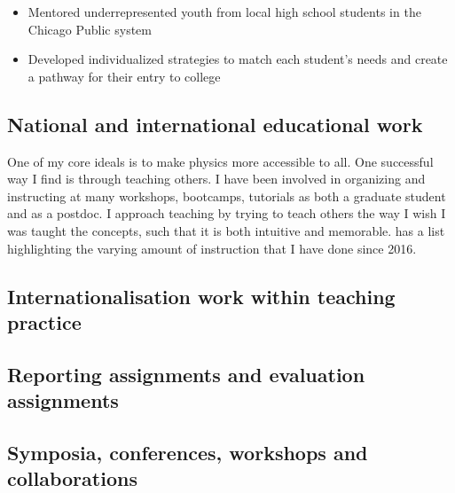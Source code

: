 \begin{itemize}
	\setlength{\itemsep}{0em}
	\item Mentored underrepresented youth from local high school students in the Chicago Public system
	\item Developed individualized strategies to match each student's needs and create a pathway for their entry to college
\end{itemize}

\subsection{National and international educational work \noneyet}\label{ssec:national-and-international-educational-work-noneyet}

One of my core ideals is to make physics more accessible to all. One successful way I find is through teaching others. I have been involved in organizing and instructing at many workshops, bootcamps, tutorials as both a graduate student and as a postdoc. I approach teaching by trying to teach others the way I wish I was taught the concepts, such that it is both intuitive and memorable.  has a list highlighting the varying amount of instruction that I have done since 2016.

\subsection{Internationalisation work within teaching practice \noneyet}\label{ssec:internationalisation-work-within-teaching-practice-noneyet}
\subsection{Reporting assignments and evaluation assignments \noneyet}\label{ssec:reporting-assignments-and-evaluation-assignments-noneyet}
\subsection{Symposia, conferences, workshops and collaborations}\label{ssec:symposia-conferences-workshops-and-collaborations}

